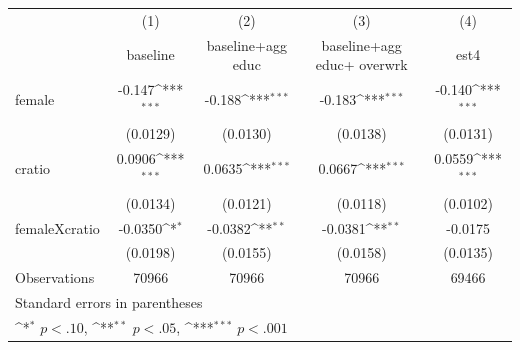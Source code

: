 {
\def\sym#1{\ifmmode^{#1}\else\(^{#1}\)\fi}
\begin{tabular}{l*{4}{c}}
\hline\hline
                    &\multicolumn{1}{c}{(1)}&\multicolumn{1}{c}{(2)}&\multicolumn{1}{c}{(3)}&\multicolumn{1}{c}{(4)}\\
                    &\multicolumn{1}{c}{baseline }&\multicolumn{1}{c}{baseline+agg educ}&\multicolumn{1}{c}{baseline+agg educ+ overwrk}&\multicolumn{1}{c}{est4}\\
\hline
female              &      -0.147\sym{***}&      -0.188\sym{***}&      -0.183\sym{***}&      -0.140\sym{***}\\
                    &    (0.0129)         &    (0.0130)         &    (0.0138)         &    (0.0131)         \\
[1em]
cratio              &      0.0906\sym{***}&      0.0635\sym{***}&      0.0667\sym{***}&      0.0559\sym{***}\\
                    &    (0.0134)         &    (0.0121)         &    (0.0118)         &    (0.0102)         \\
[1em]
femaleXcratio       &     -0.0350\sym{*}  &     -0.0382\sym{**} &     -0.0381\sym{**} &     -0.0175         \\
                    &    (0.0198)         &    (0.0155)         &    (0.0158)         &    (0.0135)         \\
\hline
Observations        &       70966         &       70966         &       70966         &       69466         \\
\hline\hline
\multicolumn{5}{l}{\footnotesize Standard errors in parentheses}\\
\multicolumn{5}{l}{\footnotesize \sym{*} \(p<.10\), \sym{**} \(p<.05\), \sym{***} \(p<.001\)}\\
\end{tabular}
}
